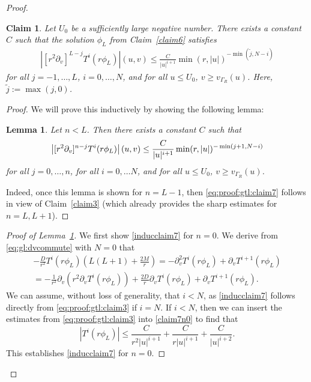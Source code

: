 \documentclass[11pt,english]{article}
\numberwithin{equation}{section}
\newtheorem{lemma}{Lemma}[section]
\theoremstyle{remark}
\theoremstyle{plain}
\newtheorem{claim}{Claim}
\theoremstyle{remark}
\newcommand{\pv}{\partial_v}
\renewcommand{\(}{\left(}
\renewcommand{\)}{\right)}
\begin{document}
\begin{proof}
	\begin{claim}\label{claim7}
	Let $U_0$ be a sufficiently large negative number. There exists a constant $C$ such that the solution $\phi_L$ from Claim~\ref{claim6} satisfies
	\begin{align}\label{eq:proof:gtl:claim7}
	\left|[r^2\pv]^{L-j}T^i(r\phi_L)\right|(u,v)\leq \frac{C}{|u|^{i+1}}\min(r,|u|)^{-\min{(\tilde{j},N-i)}}
	\end{align}
	for all $j=-1,\dots, L$, $i=0,\dots, N$, and for all $u\leq U_0$, $v\geq v_{\Gamma_R}(u)$. Here, $\tilde{j}:=\max(j,0)$.
	\end{claim}
\begin{proof}
We will prove this inductively by showing the following lemma:
\begin{lemma}\label{claim7lem}
Let $n<L$. Then there exists a constant $C$ such that
\begin{equation}
\left|\pvx{n-j}T^i(r\phi_L)\right|(u,v)\leq \frac{C}{|u|^{i+1}}\min(r, |u|)^{-\min(j+1, N-i)}\label{inducclaim7}
\end{equation}
for all $j=0,\dots, n$, for all $i=0,\dots N$, and for all $u\leq U_0$, $v\geq v_{\Gamma_R}(u)$.
\end{lemma}
Indeed, once this lemma is shown for $n=L-1$, then \eqref{eq:proof:gtl:claim7} follows in view of Claim~\ref{claim3} (which already provides the sharp estimates for $n=L, L+1$). \end{proof}
\begin{proof}[Proof of Lemma~\ref{claim7lem}]
We first show \eqref{inducclaim7} for $n=0$. We derive from \eqref{eq:gl:dvcommute} with $N=0$ that
\begin{multline}\label{claim7n0}
-\frac{D}{r^2}T^i(r\phi_L)\left(L(L+1)+\frac{2M}{r}\right)=-\pv^2T^i(r\phi_L)+\pv T^{i+1}(r\phi_L)\\
=-\frac{1}{r^2}\pv(r^2\pv T^i(r\phi_L))+\frac{2D}{r}\pv T^i(r\phi_L)+\pv T^{i+1}(r\phi_L).
\end{multline}
We can assume, without loss of generality, that $i<N$, as \eqref{inducclaim7} follows directly from \eqref{eq:proof:gtl:claim3} if $i=N$. 
If $i<N$, then we can insert the estimates from \eqref{eq:proof:gtl:claim3} into \eqref{claim7n0} to find that
\begin{equation}
|T^i(r\phi_L)|\leq \frac{C}{r^2|u|^{i+1}}+\frac{C}{r|u|^{i+1}}+\frac{C}{|u|^{i+2}}.
\end{equation}
This establishes \eqref{inducclaim7} for $n=0$. 


\end{proof}
\end{proof}
\end{document}

